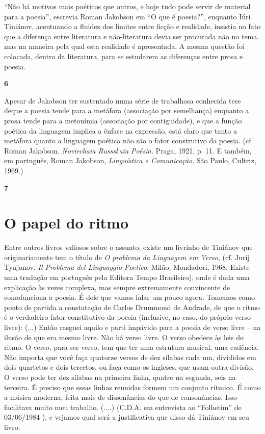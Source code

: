 ``Não há motivos mais poéticos que outros, e hoje tudo pode servir de
material para a poesia'', escrevia Roman Jakobson em ``O que é
poesia?'', enquanto Iúri Tiniánov, acentuando a fluidez dos limites
entre ficção e realidade, insistia no fato que a diferença entre
literatura e não-literatura devia ser procurada não no tema, mas na
maneira pela qual esta realidade é apresentada. A mesma questão foi
colocada, dentro da literatura, para se estudarem as diferenças entre
prosa e poesia.

\textbf{6}

Apesar de Jakobson ter sustentado numa série de trabalhosa conhecida
tese deque a poesia tende para a metáfora (associação por semelhança)
enquanto a prosa tende para a metonímia (associação por contiguidade), e
que a função poética da linguagem implica a ênfase na expressão, está
claro que tanto a metáfora quanto a linguagem poética não são o fator
construtivo da poesia. (cf. Roman Jakobson. \emph{Noviechaia Russskaia
Poésia.} Praga, 1921, p. 11. E também, em português, Roman Jakobson,
\emph{Linguística e Comunicação}. São Paulo, Cultrix, 1969.)

\textbf{7 }

\section{O papel do ritmo}

Entre outros livros valiosos sobre o assunto, existe um livrinho de
Tiniánov que originariamente tem o título de \emph{O problema da
Linguagem em Verso}, (cf. Jurij Tynjanov. \emph{Il Problema del
Linguaggio Poetico}. Milão, Mondadori, 1968. Existe uma tradução em
português pela Editora Tempo Brasileiro), onde é dada uma explicação às
vezes complexa, mas sempre extremamente convincente de comofunciona a
poesia. É dele que vamos falar um pouco agora. Tomemos como ponto de
partida a constatação de Carlos Drummond de Andrade, de que o ritmo é o
verdadeiro fator constitutivo da poesia (inclusive, no caso, do próprio
verso livre): (...) Então rasguei aquilo e parti impávido para a poesia
de verso livre -- na ilusão de que era mesmo livre. Não há verso livre.
O verso obedece às leis do ritmo. O verso, para ser verso, tem que ter
uma estrutura musical, uma cadência. Não importa que você faça quatorze
versos de dez sílabas cada um, divididos em dois quartetos e dois
tercetos, ou faça como os ingleses, que usam outra divisão. O verso pode
ter dez sílabas na primeira linha, quatro na segunda, seis na terceira.
É preciso que essas linhas reunidas formem um conjunto rítmico. É como a
música moderna, feita mais de dissonâncias do que de consonâncias. Isso
facilitava muito meu trabalho. (....) (C.D.A. em entrevista ao
``Folhetim'' de 03/06/1984 ), e vejamos qual será a justificativa que
disso dá Tiniánov em seu livro.

